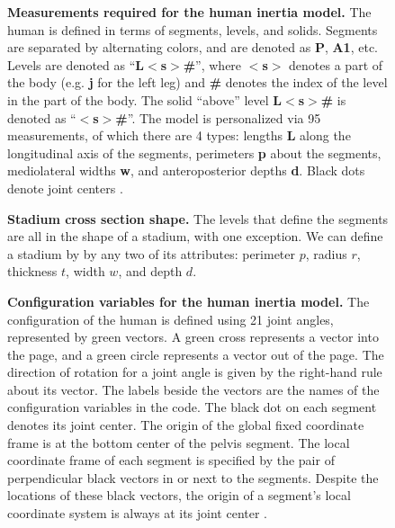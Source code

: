 \documentclass[10pt]{article}
\begin{document}
\begin{figure}[!ht]
\begin{center}
\end{center}
\caption{
{\bf Measurements required for the human inertia model.}  The human is defined
in terms of segments, levels, and solids. Segments are separated by alternating colors, and are denoted as \textbf{P},
\textbf{A1}, etc. Levels are denoted as ``\textbf{L$<$s$>$\#}'', where \textbf{$<$s$>$}
denotes a part of the body (e.g. \textbf{j} for the left leg) and \textbf{\#}
denotes the index of the level in the part of the body. The solid ``above''
level \textbf{L$<$s$>$\#} is denoted as ``\textbf{$<$s$>$\#}''. The model is
personalized via 95 measurements, of which there are 4 types: lengths
\textbf{L} along the longitudinal axis of the segments, perimeters \textbf{p}
about the segments, mediolateral widths \textbf{w}, and anteroposterior depths
\textbf{d}. Black dots denote joint centers \cite{Yeadon1990c}.
}
\label{fig:meas}
\end{figure}

\begin{figure}[!ht]
\begin{center}
\end{center}
\caption{
{\bf Stadium cross section shape.}  The levels that define the segments are all
in the shape of a stadium, with one exception. We can define a stadium by
by any two of its attributes: perimeter $p$, radius $r$, thickness $t$,  width
$w$, and depth $d$.
}
\label{fig:stadium}
\end{figure}

\begin{figure}[!ht]
\begin{center}
\end{center}
\caption{
{\bf Configuration variables for the human inertia model.}  The configuration
of the human is defined using 21 joint angles, represented by green vectors. A
green cross represents a vector into the page, and a
green circle represents a vector out of the page. The direction of rotation for
a joint angle is given by the right-hand rule about its vector. The labels
beside the vectors are the names of the configuration variables in the code.
The black dot on each segment denotes its joint center. The origin of the
global fixed coordinate frame is at the bottom center of the
pelvis segment. The local coordinate frame of each segment is specified by the
pair of perpendicular black vectors in or next to the segments. Despite the
locations of these black vectors, the origin of a segment's local coordinate
system is always at its joint center \cite{Yeadon1990e}.
}
\label{fig:config}
\end{figure}
\end{document}
